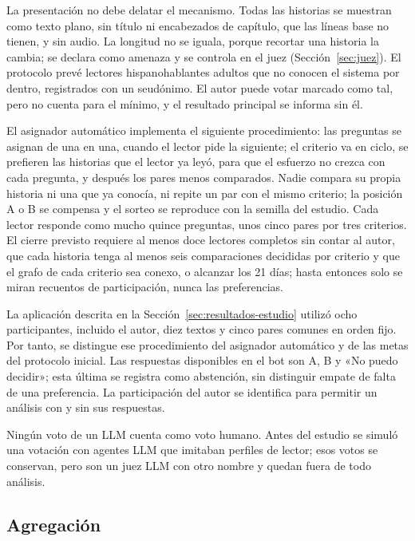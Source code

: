 La presentación no debe delatar el mecanismo. Todas las historias se muestran como texto plano, sin
título ni encabezados de capítulo, que las líneas base no tienen, y sin audio. La longitud no se
iguala, porque recortar una historia la cambia; se declara como amenaza y se controla en el juez
(Sección~\ref{sec:juez}). El protocolo prevé lectores hispanohablantes adultos que no conocen el sistema por
dentro, registrados con un seudónimo. El autor puede votar marcado como tal, pero no cuenta para
el mínimo, y el resultado principal se informa sin él.

El asignador automático implementa el siguiente procedimiento: las preguntas se asignan de una en
una, cuando el lector pide la siguiente; el criterio va en ciclo,
se prefieren las historias que el lector ya leyó, para que el esfuerzo no crezca con cada pregunta, y
después los pares menos comparados. Nadie compara su propia historia ni una que ya conocía, ni
repite un par con el mismo criterio; la posición A o B se compensa y el sorteo se reproduce con la
semilla del estudio. Cada lector responde como mucho quince preguntas, unos cinco pares por tres
criterios. El cierre previsto requiere al menos doce lectores completos sin contar al autor, que cada
historia tenga al menos seis comparaciones decididas por criterio y que el grafo de cada criterio sea
conexo, o alcanzar los 21 días; hasta entonces solo se miran recuentos de participación, nunca las
preferencias.

La aplicación descrita en la Sección~\ref{sec:resultados-estudio} utilizó ocho participantes, incluido
el autor, diez textos y cinco pares comunes en orden fijo. Por tanto, se distingue ese procedimiento
del asignador automático y de las metas del protocolo inicial. Las respuestas disponibles en el bot
son A, B y «No puedo decidir»; esta última se registra como abstención, sin distinguir empate de
falta de una preferencia. La participación del autor se identifica para permitir un análisis con y
sin sus respuestas.

Ningún voto de un LLM cuenta como voto humano. Antes del estudio se simuló una votación con agentes
LLM que imitaban perfiles de lector; esos votos se conservan, pero son un juez LLM con otro nombre y
quedan fuera de todo análisis.

\subsection{Agregación}\label{sec:agregacion}

